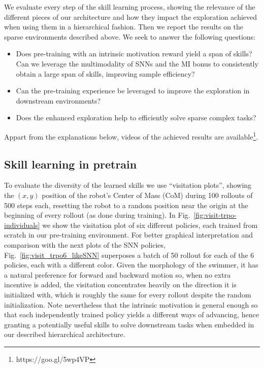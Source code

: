 \documentclass{article} %
\begin{document}
We evaluate every step of the skill learning process, showing the relevance of the different pieces of our architecture and how they impact the exploration achieved when using them in a hierarchical fashion. Then we report the results on the sparse environments described above. We seek to answer the following questions:
\begin{itemize}
    \item Does pre-training with an intrinsic motivation reward yield a span of skills? Can we leverage the multimodality of SNNs and the MI bonus to consistently obtain a large span of skills, improving sample efficiency? 
    \item Can the pre-training experience be leveraged to improve the exploration in downstream environments?
    \item Does the enhanced exploration help to efficiently solve sparse complex tasks?
\end{itemize}
Appart from the explanations below, videos of the achieved results are available\footnote{https://goo.gl/5wp4VP}.

\subsection{Skill learning in pretrain}

To evaluate the diversity of the learned skills we use ``visitation plots'', showing the $(x,y)$ position of the robot's Center of Mass (CoM) during 100 rollouts of 500 steps each, resetting the robot to a random position near the origin at the beginning of every rollout (as done during training). In Fig.\ \ref{fig:visit-trpo-individuals} we show the visitation plot of six different policies, each trained from scratch in our pre-training environment. For better graphical interpretation and comparison with the next plots of the SNN policies, Fig.\ \ref{fig:visit_trpo6_likeSNN} superposes a batch of 50 rollout for each of the 6 policies, each with a different color. Given the morphology of the swimmer, it has a natural preference for forward and backward motion so, when no extra incentive is added, the visitation concentrates heavily on the direction it is initialized with, which is roughly the same for every rollout despite the random initialization. Note nevertheless that the intrinsic motivation is general enough so that each independently trained policy yields a different ways of advancing, hence granting a potentially useful skills to solve downstream tasks when embedded in our described hierarchical architecture.
\end{document}
